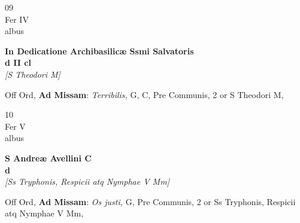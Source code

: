 \documentclass[10pt, openany]{book}
\begin{document}
        \begin{center}
            \begin{minipage}{3.5in}
                \vspace{2em}
                \begin{minipage}{0.5in}
                    {\Huge 09} \\
                    {\normalsize Fer IV} \\
                    {\normalsize albus}
                \end{minipage}
                \begin{minipage}{3.0in}
                    \textbf{ \large In Dedicatione Archibasilicæ Ssmi Salvatoris \\
                    \textnormal{\normalsize d II cl}} \\ \textit{[S Theodori M]} \\ 
                \end{minipage}
                \begin{justify}Off Ord, \textbf{Ad Missam}: \textit{Terribilis,} G, C, Pre Communis, 2 or S Theodori M,  
                \end{justify}
            \end{minipage}
        \end{center}
    
        \begin{center}
            \begin{minipage}{3.5in}
                \vspace{2em}
                \begin{minipage}{0.5in}
                    {\Huge 10} \\
                    {\normalsize Fer V} \\
                    {\normalsize albus}
                \end{minipage}
                \begin{minipage}{3.0in}
                    \textbf{ \large S Andreæ Avellini C \\
                    \textnormal{\normalsize d}} \\ \textit{[Ss Tryphonis, Respicii atq Nymphae V Mm]} \\ 
                \end{minipage}
                \begin{justify}Off Ord, \textbf{Ad Missam}: \textit{Os justi,} G, Pre Communis, 2 or Ss Tryphonis, Respicii atq Nymphae V Mm,  
                \end{justify}
            \end{minipage}
        \end{center}
    
\end{document}
